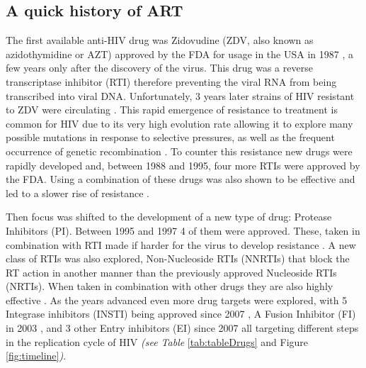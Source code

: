 \documentclass[
  11pt,
  twoside,
  BCOR=10mm,
  listof=totoc]{scrbook}
\begin{document}
\hypertarget{a-quick-history-of-art}{%
\subsection{A quick history of ART}\label{a-quick-history-of-art}}

The first available anti-HIV drug was Zidovudine (ZDV, also known as azidothymidine or AZT) approved by the FDA for usage in the USA in 1987 \autocite{fischlEfficacyAzidothymidineAZT1987}, a few years only after the discovery of the virus. This drug was a reverse transcriptase inhibitor (RTI) therefore preventing the viral RNA from being transcribed into viral DNA. Unfortunately, 3 years later strains of HIV resistant to ZDV were circulating \autocite{richmanSusceptibilityNucleosideAnalogues1990}. This rapid emergence of resistance to treatment is common for HIV \autocite{yeoDeterminationHIV1RT2020} due to its very high evolution rate \autocite{cuevasExtremelyHighMutation2015} allowing it to explore many possible mutations in response to selective pressures, as well as the frequent occurrence of genetic recombination \autocite{carvajal-rodriguezRecombinationFavorsEvolution2007}. To counter this resistance new drugs were rapidly developed and, between 1988 and 1995, four more RTIs were approved by the FDA. Using a combination of these drugs was also shown to be effective and led to a slower rise of resistance \autocite{gulickTreatmentIndinavirZidovudine1997}.

Then focus was shifted to the development of a new type of drug: Protease Inhibitors (PI). Between 1995 and 1997 4 of them were approved. These, taken in combination with RTI made if harder for the virus to develop resistance \autocite{wensingFifteenYearsHIV2010}. A new class of RTIs was also explored, Non-Nucleoside RTIs (NNRTIs) that block the RT action in another manner than the previously approved Nucleoside RTIs (NRTIs). When taken in combination with other drugs they are also highly effective \autocite{pedersenNonNucleosideReverseTranscriptase1999}. As the years advanced even more drug targets were explored, with 5 Integrase inhibitors (INSTI) being approved since 2007 \autocite{scarsiHIV1IntegraseInhibitors2020}, A Fusion Inhibitor (FI) in 2003 \autocite{fletcherEnfuvirtideNewDrug2003}, and 3 other Entry inhibitors (EI) \autocite{esteHIVEntryInhibitors2007,kilbyNovelTherapiesBased2003} since 2007 all targeting different steps in the replication cycle of HIV \emph{(see Table} \ref{tab:tableDrugs} and Figure \ref{fig:timeline}\emph{)}.
\end{document}
